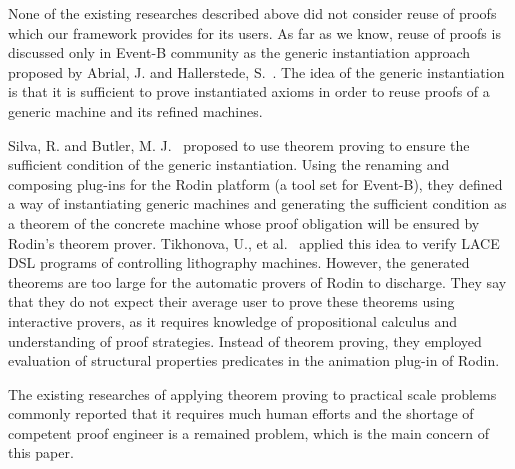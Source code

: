 \documentclass[12pt]{report}
\begin{document}
None of the existing researches described above did not consider reuse
of proofs which our framework provides for its users.  As far as we
know, reuse of proofs is discussed only in Event-B community as the
generic instantiation approach proposed by Abrial, J. and Hallerstede,
S.~\cite{AbrialH07}. The idea of the generic instantiation is that it
is sufficient to prove instantiated axioms in order to reuse proofs of
a generic machine and its refined machines. 

Silva, R. and Butler, M. J.~\cite{SilvaB09} proposed to use theorem
proving to ensure the sufficient condition of the generic
instantiation. Using the renaming and composing plug-ins for the Rodin
platform (a tool set for Event-B), they defined a way of instantiating
generic machines and generating the sufficient condition as a theorem
of the concrete machine whose proof obligation will be ensured by
Rodin's theorem prover.  Tikhonova, U., et al.~\cite{TikhonovaMBAV13}
applied this idea to verify LACE DSL programs of controlling
lithography machines. However, the generated theorems are too large
for the automatic provers of Rodin to discharge. They say that they do
not expect their average user to prove these theorems using
interactive provers, as it requires knowledge of propositional
calculus and understanding of proof strategies. Instead of theorem
proving, they employed evaluation of structural properties predicates
in the animation plug-in of Rodin.

The existing researches of applying theorem proving to practical scale
problems commonly reported that it requires much human efforts and the
shortage of competent proof engineer is a remained problem, which is
the main concern of this paper.
\end{document}
